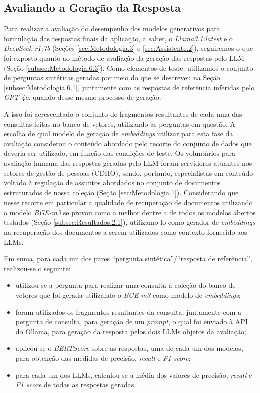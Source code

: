 \subsection{Avaliando a Geração da Resposta}
\label{subsec:Resultados.2.2}

Para realizar a avaliação do desempenho dos modelos generativos para formulação das respostas finais da aplicação, a saber, o \textit{Llama3.1:latest} e o \textit{DeepSeek-r1:7b} (Seções \ref{sec:Metodologia.3} e \ref{sec:Assistente.2}), seguiremos o que foi exposto quanto ao método de avaliação da geração das respostas pelo \ac{LLM} (Seção \ref{subsec:Metodologia.6.3}). Como elementos de teste, utilizamos o conjunto de perguntas sintéticas geradas por meio do que se descreveu na Seção \ref{subsec:Metodologia.6.1}, juntamente com as respostas de referência inferidas pelo \textit{GPT-4o}, quando desse mesmo processo de geração.

A isso foi acrescentado o conjunto de fragmentos resultantes de cada uma das consultas feitas no banco de vetores, utilizando as perguntas em questão. A escolha de qual modelo de geração de \textit{embeddings} utilizar para esta fase da avaliação considerou o conteúdo abordado pelo recorte do conjunto de dados que deveria ser utilizado, em função das condições de teste. Os voluntários para avaliação humana das respostas geradas pelo \ac{LLM} foram servidores atuantes nos setores de gestão de pessoas (\ac{CDHO}), sendo, portanto, especialistas em conteúdo voltado à regulação de assuntos abordados no conjunto de documentos estruturados de nossa coleção (Seção \ref{sec:Metodologia.1}). Considerando que nesse recorte em particular a qualidade de recuperação de documentos utilizando o modelo \textit{BGE-m3} se provou como a melhor dentre a de todos os modelos abertos testados (Seção \ref{subsec:Resultados.2.1}), utilizamo-lo como gerador de \textit{embeddings} na recuperação dos documentos a serem utilizados como contexto fornecido aos \ac{LLM}s.

Em suma, para cada um dos pares ``pergunta sintética''/``resposta de referência'', realizou-se o seguinte:

\begin{itemize}
    \item utilizou-se a pergunta para realizar uma consulta à coleção do banco de vetores que foi gerada utilizando o \textit{BGE-m3} como modelo de \textit{embeddings};
    \item foram utilizados os fragmentos resultantes da consulta, juntamente com a pergunta de consulta, para geração de um \textit{prompt}, o qual foi enviado à API do Ollama, para geração da resposta pelos dois \ac{LLM}s objetos da avaliação;
    \item aplicou-se o \textit{BERTScore} sobre as respostas, uma de cada um dos modelos, para obtenção das medidas de precisão, \textit{recall} e \textit{F1 score};
    \item para cada um dos \ac{LLM}s, calculou-se a média dos valores de precisão, \textit{recall} e \textit{F1 score} de todas as respostas geradas.
\end{itemize}

